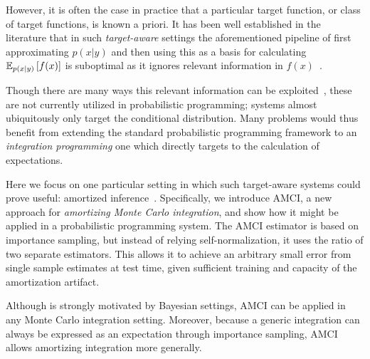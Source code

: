 \documentclass[12pt]{article}
\begin{document}
However, it is often the case in practice that a particular target function, or class of
target functions, is known a priori.  
It has been well established in the literature that in such \emph{target-aware}
settings the aforementioned pipeline of first approximating $p(x|y)$ and then using this
as a basis for calculating $\mathbb{E}_{p(x|y)} \left[f(x)\right]$ is 
suboptimal as it ignores relevant information in
$f(x)$~\citep{mcbook,lacoste2011losscalibrated}.

Though there are many ways this relevant information can be 
exploited~\cite{hesterberg1988advances,wolpert1991monte,oh1992adaptive,evans1995methods,cerou2007adaptive,cerou2012sequential,
	de2005tutorial,lacoste2011losscalibrated,villen1994restart},
these are not currently utilized in probabilistic programming; systems
almost ubiquitously only target
the conditional distribution.  Many 
problems would thus benefit from extending the standard
probabilistic programming framework to an
\emph{integration programming} one which directly targets to the
calculation of expectations.

Here we focus on one particular setting in which
such target-aware systems could prove useful: amortized 
inference~\citep{ritchie2016deep,PaigeWood2016,LeEtAl2016}.
Specifically, we introduce AMCI, a new approach 
for \emph{amortizing Monte Carlo integration}, and show how
it might be applied in a probabilistic programming system.  The AMCI
estimator is based on importance sampling, but instead of relying
self-normalization, it uses the ratio of two separate estimators.
This allows it to achieve an arbitrary small error from single
sample estimates at test time, given sufficient
training and capacity of the amortization artifact.

Although is strongly motivated by Bayesian settings,
AMCI can be applied in any Monte Carlo integration setting.
Moreover, because
a generic integration can always be expressed
as an expectation through importance sampling, AMCI
allows amortizing integration more generally.

\end{document}
